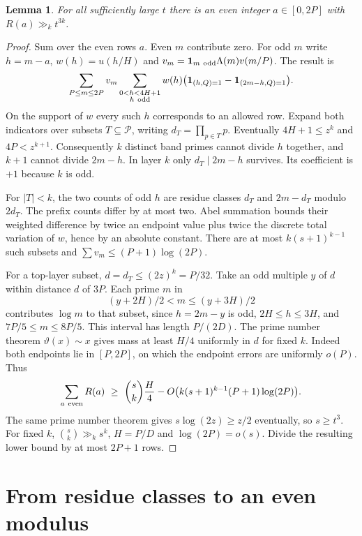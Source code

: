 \documentclass[11pt,a4paper]{article}
\newtheorem{lemma}[theorem]{Lemma}
\newcommand{\one}{\mathbf 1}
\begin{document}
\begin{lemma}\label{lm:row}
For all sufficiently large $t$ there is an even integer $a\in[0,2P]$ with $R(a)\gg_k t^{3k}$.
\end{lemma}
\begin{proof}
Sum over the even rows $a$. Even $m$ contribute zero. For odd $m$ write $h=m-a$, $w(h)=u(h/H)$ and $v_m=\one_{m\ {\rm odd}}\Lambda(m)v(m/P)$. The result is
\[
 \sum_{P\le m\le2P}v_m
 \sum_{\substack{0<h<4H+1\\ h\ {\rm odd}}}w(h)
 \bigl(\one_{(h,Q)=1}-\one_{(2m-h,Q)=1}\bigr).
\]
On the support of $w$ every such $h$ corresponds to an allowed row. Expand both indicators over subsets $T\subseteq\mathcal P$, writing $d_T=\prod_{p\in T}p$. Eventually $4H+1\le z^k$ and $4P<z^{k+1}$. Consequently $k$ distinct band primes cannot divide $h$ together, and $k+1$ cannot divide $2m-h$. In layer $k$ only $d_T\mid2m-h$ survives. Its coefficient is $+1$ because $k$ is odd.

For $|T|<k$, the two counts of odd $h$ are residue classes $d_T$ and $2m-d_T$ modulo $2d_T$. The prefix counts differ by at most two. Abel summation bounds their weighted difference by twice an endpoint value plus twice the discrete total variation of $w$, hence by an absolute constant. There are at most $k(s+1)^{k-1}$ such subsets and $\sum v_m\le(P+1)\log(2P)$.

For a top-layer subset, $d=d_T\le(2z)^k=P/32$. Take an odd multiple $y$ of $d$ within distance $d$ of $3P$. Each prime $m$ in
\[
   (y+2H)/2<m\le(y+3H)/2
\]
contributes $\log m$ to that subset, since $h=2m-y$ is odd, $2H\le h\le3H$, and $7P/5\le m\le8P/5$. This interval has length $P/(2D)$. The prime number theorem $\vartheta(x)\sim x$ gives mass at least $H/4$ uniformly in $d$ for fixed $k$. Indeed both endpoints lie in $[P,2P]$, on which the endpoint errors are uniformly $o(P)$. Thus
\[
 \sum_{a\ {\rm even}}R(a)\ \ge\
 \binom{s}{k}\frac H4-O\bigl(k(s+1)^{k-1}(P+1)\log(2P)\bigr).
\]
The same prime number theorem gives $s\log(2z)\ge z/2$ eventually, so $s\ge t^3$. For fixed $k$, $\binom{s}{k}\gg_k s^k$, $H=P/D$ and $\log(2P)=o(s)$. Divide the resulting lower bound by at most $2P+1$ rows.
\end{proof}

\section{From residue classes to an even modulus}\label{sec:transfer}
\end{document}
